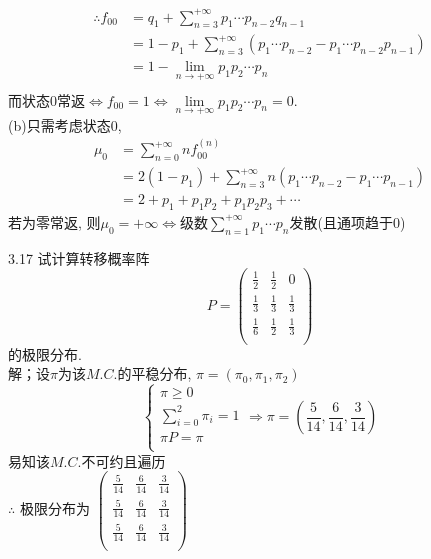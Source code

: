 \[
\begin{split}
\therefore f_{00} & = q_1 + \sum^{+\infty}_{n=3}p_1\cdots p_{n-2}q_{n-1}\\
				& = 1 - p_1 + \sum^{+\infty}_{n=3}(p_1\cdots p_{n-2} - p_1\cdots p_{n-2}p_{n-1})\\
				& = 1 - \lim_{n\rightarrow +\infty}p_1p_2\cdots p_n\\
\end{split}
\]
而状态$0$常返$\Leftrightarrow f_{00} = 1 \Leftrightarrow \lim\limits_{n\rightarrow +\infty}p_1p_2\cdots p_n = 0$.\\
(b)只需考虑状态$0$, 
\[
\begin{split}
\mu_0 & = \sum^{+\infty}_{n=0}nf^{(n)}_{00}\\
	& = 2(1-p_1)+\sum^{+\infty}_{n=3}n(p_1\cdots p_{n-2} - p_1\cdots p_{n-1})\\
	& = 2 + p_1 + p_1p_2 + p_1p_2p_3 + \cdots
\end{split}
\]
若为零常返, 则$\mu_0 = +\infty \Leftrightarrow $级数$\sum\limits^{+\infty}_{n=1}p_1\cdots p_n$发散(且通项趋于$0$)


3.17 试计算转移概率阵
\[
P =
\begin{pmatrix}
	\frac{1}{2} & \frac{1}{2} & 0\\
	\frac{1}{3} & \frac{1}{3} & \frac{1}{3}\\
	\frac{1}{6} & \frac{1}{2} & \frac{1}{3}\\
\end{pmatrix}
\]
的极限分布.\\
解；设$\pi$为该$M.C.$的平稳分布, $\pi = (\pi_0, \pi_1, \pi_2)$\\
\[
\begin{cases}
\pi \geqslant 0\\
\sum\limits^2_{i=0} \pi_i = 1\\
\pi P = \pi\\
\end{cases}
\Rightarrow
\pi = (\frac{5}{14}, \frac{6}{14}, \frac{3}{14})
\]
易知该$M.C.$不可约且遍历\\
$\therefore$ 极限分布为
$
\begin{pmatrix}
	\frac{5}{14} & \frac{6}{14} & \frac{3}{14}\\
	\frac{5}{14} & \frac{6}{14} & \frac{3}{14}\\
	\frac{5}{14} & \frac{6}{14} & \frac{3}{14}\\
\end{pmatrix}
$


